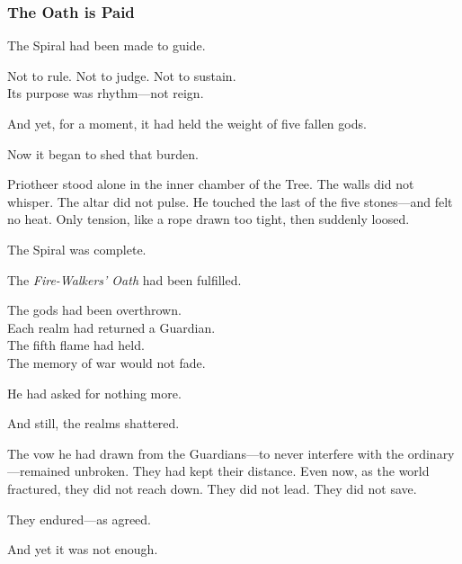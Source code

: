 \documentclass[12pt]{article}
\begin{document}
\dotfill

\subsubsection*{The Oath is Paid}

The Spiral had been made to guide.

\vspace{0.5em}
Not to rule. Not to judge. Not to sustain.\\
Its purpose was rhythm---not reign.

\vspace{0.5em}
And yet, for a moment, it had held the weight of five fallen gods.

\vspace{0.5em}
Now it began to shed that burden.

\vspace{0.5em}
Priotheer stood alone in the inner chamber of the Tree. The walls did not whisper. The altar did not pulse. He touched the last of the five stones---and felt no heat. Only tension, like a rope drawn too tight, then suddenly loosed.

\vspace{0.5em}
The Spiral was complete.

\vspace{0.5em}
The \textit{Fire-Walkers’ Oath} had been fulfilled.

\vspace{0.5em}
The gods had been overthrown.\\
Each realm had returned a Guardian.\\
The fifth flame had held.\\
The memory of war would not fade.

\vspace{0.5em}
He had asked for nothing more.

\vspace{0.5em}
And still, the realms shattered.

\vspace{0.5em}
The vow he had drawn from the Guardians---to never interfere with the ordinary---remained unbroken. They had kept their distance. Even now, as the world fractured, they did not reach down. They did not lead. They did not save.

\vspace{0.5em}
They endured---as agreed.

\vspace{0.5em}
And yet it was not enough.
\end{document}
